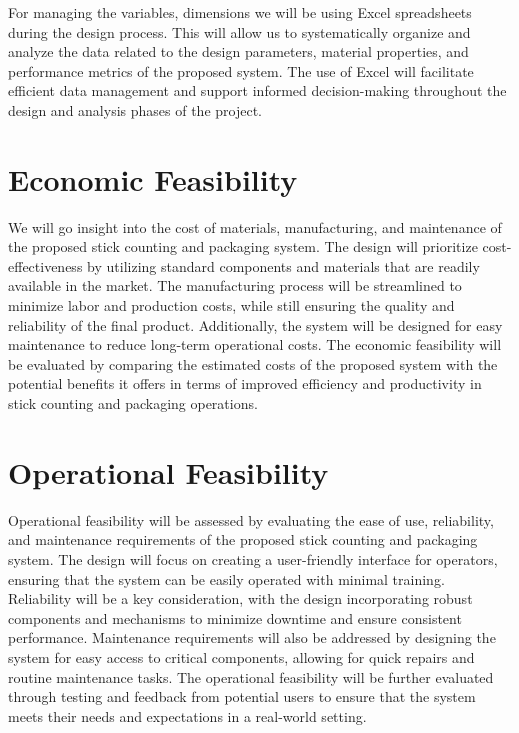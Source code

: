 For managing the variables, dimensions we will be using Excel spreadsheets during the design process. This will allow us to systematically organize and analyze the data related to the design parameters, material properties, and performance metrics of the proposed system. The use of Excel will facilitate efficient data management and support informed decision-making throughout the design and analysis phases of the project.

\section{Economic Feasibility}
We will go insight into the cost of materials, manufacturing, and maintenance of the proposed stick counting and packaging system. The design will prioritize cost-effectiveness by utilizing standard components and materials that are readily available in the market. The manufacturing process will be streamlined to minimize labor and production costs, while still ensuring the quality and reliability of the final product. Additionally, the system will be designed for easy maintenance to reduce long-term operational costs. The economic feasibility will be evaluated by comparing the estimated costs of the proposed system with the potential benefits it offers in terms of improved efficiency and productivity in stick counting and packaging operations.

\section{Operational Feasibility}
Operational feasibility will be assessed by evaluating the ease of use, reliability, and maintenance requirements of the proposed stick counting and packaging system. The design will focus on creating a user-friendly interface for operators, ensuring that the system can be easily operated with minimal training. Reliability will be a key consideration, with the design incorporating robust components and mechanisms to minimize downtime and ensure consistent performance. Maintenance requirements will also be addressed by designing the system for easy access to critical components, allowing for quick repairs and routine maintenance tasks. The operational feasibility will be further evaluated through testing and feedback from potential users to ensure that the system meets their needs and expectations in a real-world setting.
